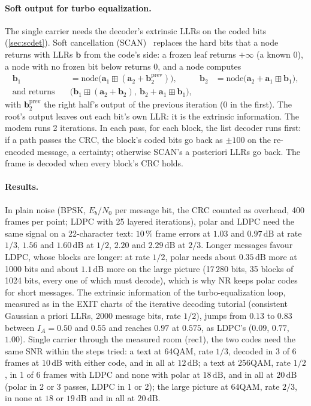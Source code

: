 \documentclass[11pt,a4paper]{article}
\newcommand{\dB}{\,\mathrm{dB}}
\theoremstyle{remark}
\begin{document}
\paragraph{Soft output for turbo equalization.}
The single carrier needs the decoder's extrinsic LLRs on the coded bits (\cref{sec:scdet}). Soft cancellation (SCAN)~\cite{scan} replaces the hard bits that a node returns with LLRs $\bm b$ from the code's side: a frozen leaf returns $+\infty$ (a known 0), a node with no frozen bit below returns $0$, and a node computes
\begin{align}
\bm b_1 &= \mathrm{node}\bigl(\bm a_1 \boxplus (\bm a_2 + \bm b_2^{\mathrm{prev}})\bigr), &
\bm b_2 &= \mathrm{node}\bigl(\bm a_2 + \bm a_1 \boxplus \bm b_1\bigr),\\
\text{and returns}\quad & \bigl(\bm b_1 \boxplus (\bm a_2 + \bm b_2),\ \bm b_2 + \bm a_1 \boxplus \bm b_1\bigr), &&
\end{align}
with $\bm b_2^{\mathrm{prev}}$ the right half's output of the previous iteration (0 in the first). The root's output leaves out each bit's own LLR: it is the extrinsic information. The modem runs 2 iterations. In each pass, for each block, the list decoder runs first: if a path passes the CRC, the block's coded bits go back as $\pm 100$ on the re-encoded message, a certainty; otherwise SCAN's a posteriori LLRs go back. The frame is decoded when every block's CRC holds.

\paragraph{Results.}
In plain noise (BPSK, $E_b/N_0$ per message bit, the CRC counted as overhead, 400 frames per point; LDPC with 25 layered iterations), polar and LDPC need the same signal on a 22-character text: $10\,\%$ frame errors at $1.03$ and $0.97\dB$ at rate $1/3$, $1.56$ and $1.60\dB$ at $1/2$, $2.20$ and $2.29\dB$ at $2/3$. Longer messages favour LDPC, whose blocks are longer: at rate $1/2$, polar needs about $0.35\dB$ more at 1000 bits and about $1.1\dB$ more on the large picture (17\,280 bits, 35 blocks of 1024 bits, every one of which must decode), which is why NR keeps polar codes for short messages. The extrinsic information of the turbo-equalization loop, measured as in the EXIT charts of the iterative decoding tutorial (consistent Gaussian a priori LLRs, 2000 message bits, rate $1/2$), jumps from $0.13$ to $0.83$ between $I_A = 0.50$ and $0.55$ and reaches $0.97$ at $0.575$, as LDPC's ($0.09$, $0.77$, $1.00$). Single carrier through the measured room (rec1), the two codes need the same SNR within the steps tried: a text at 64QAM, rate $1/3$, decoded in 3 of 6 frames at $10\dB$ with either code, and in all at $12\dB$; a text at 256QAM, rate $1/2$, in 1 of 6 frames with LDPC and none with polar at $18\dB$, and in all at $20\dB$ (polar in 2 or 3 passes, LDPC in 1 or 2); the large picture at 64QAM, rate $2/3$, in none at $18$ or $19\dB$ and in all at $20\dB$.
\end{document}
